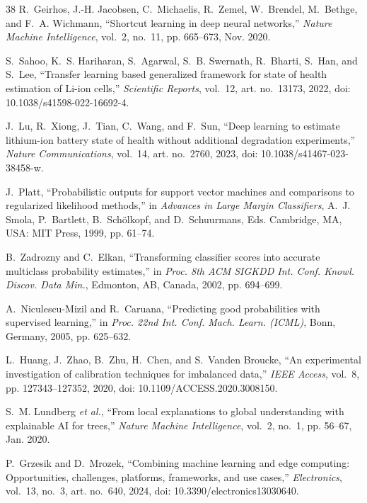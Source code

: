 \documentclass[11pt,a4paper]{article}
\begin{document}
\begin{thebibliography}{38}
R.~Geirhos, J.-H. Jacobsen, C.~Michaelis, R.~Zemel, W.~Brendel, M.~Bethge, and F.~A. Wichmann, ``Shortcut learning in deep neural networks,'' \emph{Nature Machine Intelligence}, vol.~2, no.~11, pp. 665--673, Nov. 2020.

S.~Sahoo, K.~S. Hariharan, S.~Agarwal, S.~B. Swernath, R.~Bharti, S.~Han, and S.~Lee, ``Transfer learning based generalized framework for state of health estimation of Li-ion cells,'' \emph{Scientific Reports}, vol.~12, art. no.~13173, 2022, doi: 10.1038/s41598-022-16692-4.

J.~Lu, R.~Xiong, J.~Tian, C.~Wang, and F.~Sun, ``Deep learning to estimate lithium-ion battery state of health without additional degradation experiments,'' \emph{Nature Communications}, vol.~14, art. no.~2760, 2023, doi: 10.1038/s41467-023-38458-w.

J.~Platt, ``Probabilistic outputs for support vector machines and comparisons to regularized likelihood methods,'' in \emph{Advances in Large Margin Classifiers}, A.~J. Smola, P.~Bartlett, B.~Sch\"olkopf, and D.~Schuurmans, Eds. Cambridge, MA, USA: MIT Press, 1999, pp. 61--74.

B.~Zadrozny and C.~Elkan, ``Transforming classifier scores into accurate multiclass probability estimates,'' in \emph{Proc. 8th ACM SIGKDD Int. Conf. Knowl. Discov. Data Min.}, Edmonton, AB, Canada, 2002, pp. 694--699.

A.~Niculescu-Mizil and R.~Caruana, ``Predicting good probabilities with supervised learning,'' in \emph{Proc. 22nd Int. Conf. Mach. Learn. (ICML)}, Bonn, Germany, 2005, pp. 625--632.

L.~Huang, J.~Zhao, B.~Zhu, H.~Chen, and S.~Vanden Broucke, ``An experimental investigation of calibration techniques for imbalanced data,'' \emph{IEEE Access}, vol.~8, pp. 127343--127352, 2020, doi: 10.1109/ACCESS.2020.3008150.

S.~M. Lundberg \emph{et al.}, ``From local explanations to global understanding with explainable AI for trees,'' \emph{Nature Machine Intelligence}, vol.~2, no.~1, pp. 56--67, Jan. 2020.

P.~Grzesik and D.~Mrozek, ``Combining machine learning and edge computing: Opportunities, challenges, platforms, frameworks, and use cases,'' \emph{Electronics}, vol.~13, no.~3, art. no.~640, 2024, doi: 10.3390/electronics13030640.


\end{thebibliography}
\end{document}
